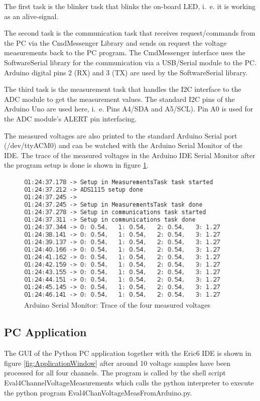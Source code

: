 \documentclass[11pt, oneside]{scrartcl}   	%
\begin{document}
The first task is the blinker task that blinks the on-board LED, i.~e. it is working as an alive-signal.

The second task is the communication task that receives request/commands from the PC via the CmdMessenger Library and sends on request the voltage measurements
back to the PC program. The CmdMessenger interface uses the SoftwareSerial library for the communication via a USB/Serial module to the PC. 
Arduino digital pins 2 (RX) and 3 (TX) are used by the SoftwareSerial library.

The third task is the measurement task that handles the I2C interface to the ADC module to get the measurement values. The standard I2C pins of the Arduino Uno are used here, i.~e. Pins A4/SDA and A5/SCL). Pin A0 is used for the ADC module's ALERT pin interfacing.

The measured voltages are also printed to the standard Arduino Serial port (/dev/ttyACM0) and can be watched with the Arduino Serial Monitor of the IDE.
The trace of the measured voltages in the Arduino IDE Serial Monitor after the program setup is done is shown in figure \ref{fig:ArduinoSerialMonitorTrace}.
\begin{figure}[htbp]
	\centering
	\includegraphics[width=0.9\linewidth]{Figures/ArduinoSerialMonitorTrace.png}
	\caption[Arduino Serial Monitor: Trace of four measured voltages]{Arduino Serial Monitor: Trace of the four measured voltages}
	\label{fig:ArduinoSerialMonitorTrace}
\end{figure}


\subsection{PC Application}
The GUI of the Python PC application together with the Eric6 IDE is shown in figure \ref{fig:ApplicationWindow} after around 10 voltage samples have been processed for all four channels.
The program is called by the shell script Eval4ChannelVoltageMeasurements which calls the python interpreter to execute the python program Eval4ChanVoltageMeasFromArduino.py.\\
\end{document}
